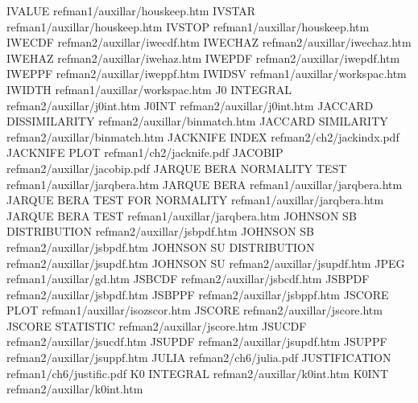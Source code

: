 IVALUE                                  refman1/auxillar/houskeep.htm
IVSTAR                                  refman1/auxillar/houskeep.htm
IVSTOP                                  refman1/auxillar/houskeep.htm
IWECDF                                  refman2/auxillar/iwecdf.htm
IWECHAZ                                 refman2/auxillar/iwechaz.htm
IWEHAZ                                  refman2/auxillar/iwehaz.htm
IWEPDF                                  refman2/auxillar/iwepdf.htm
IWEPPF                                  refman2/auxillar/iweppf.htm
IWIDSV                                  refman1/auxillar/workspac.htm
IWIDTH                                  refman1/auxillar/workspac.htm
J0 INTEGRAL                             refman2/auxillar/j0int.htm
J0INT                                   refman2/auxillar/j0int.htm
JACCARD DISSIMILARITY                   refman2/auxillar/binmatch.htm
JACCARD SIMILARITY                      refman2/auxillar/binmatch.htm
JACKNIFE INDEX                          refman2/ch2/jackindx.pdf
JACKNIFE PLOT                           refman1/ch2/jacknife.pdf
JACOBIP                                 refman2/auxillar/jacobip.pdf
JARQUE BERA NORMALITY TEST              refman1/auxillar/jarqbera.htm
JARQUE BERA                             refman1/auxillar/jarqbera.htm
JARQUE BERA TEST FOR NORMALITY          refman1/auxillar/jarqbera.htm
JARQUE BERA TEST                        refman1/auxillar/jarqbera.htm
JOHNSON SB DISTRIBUTION                 refman2/auxillar/jsbpdf.htm
JOHNSON SB                              refman2/auxillar/jsbpdf.htm
JOHNSON SU DISTRIBUTION                 refman2/auxillar/jsupdf.htm
JOHNSON SU                              refman2/auxillar/jsupdf.htm
JPEG                                    refman1/auxillar/gd.htm
JSBCDF                                  refman2/auxillar/jsbcdf.htm
JSBPDF                                  refman2/auxillar/jsbpdf.htm
JSBPPF                                  refman2/auxillar/jsbppf.htm
JSCORE PLOT                             refman1/auxillar/isozscor.htm
JSCORE                                  refman2/auxillar/jscore.htm
JSCORE STATISTIC                        refman2/auxillar/jscore.htm
JSUCDF                                  refman2/auxillar/jsucdf.htm
JSUPDF                                  refman2/auxillar/jsupdf.htm
JSUPPF                                  refman2/auxillar/jsuppf.htm
JULIA                                   refman2/ch6/julia.pdf
JUSTIFICATION                           refman1/ch6/justific.pdf
K0 INTEGRAL                             refman2/auxillar/k0int.htm
K0INT                                   refman2/auxillar/k0int.htm
